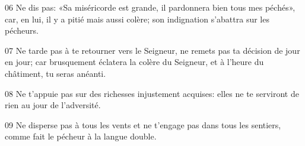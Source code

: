 
06 Ne dis pas: «Sa miséricorde est grande, il pardonnera bien tous mes péchés», car, en lui, il y a pitié mais aussi colère; son indignation s’abattra sur les pécheurs.

07 Ne tarde pas à te retourner vers le Seigneur, ne remets pas ta décision de jour en jour; car brusquement éclatera la colère du Seigneur, et à l’heure du châtiment, tu seras anéanti.

08 Ne t’appuie pas sur des richesses injustement acquises: elles ne te serviront de rien au jour de l’adversité.

09 Ne disperse pas à tous les vents et ne t’engage pas dans tous les sentiers, comme fait le pécheur à la langue double.

